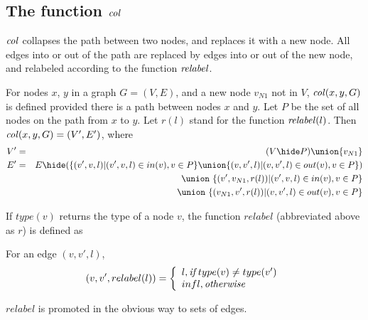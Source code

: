 \subsection{The function $\col$}




$\col$ collapses the path between two nodes, and replaces it with a new node. All edges into or out of the path are replaced by edges into or out of the new node, and  relabeled according to the function $\mathit{relabel}$.
  
\begin{definition}[$\col$]  \label{def:col}
  For nodes $x$, $y$ in a graph $G = (V,E)$, and a new node $v_{N1}$ not in $V$,  $\mathit{col}(x,y,G)$ is defined provided there is a path between nodes $x$ and $y$. Let $P$ be the set of all nodes on the path from $x$ to $y$. Let $r(l)$ stand for the function $\mathit{relabel}(l)$. Then $\mathit{col}(x,y,G) =  (V',E')$, where 
  \begin{eqnarray*}
  V' & = & (V\hide P) \union \{v_{N1}\}     \\
  E' & = & E\hide (
                   \{(v',v,l)|(v',v,l) \in in(v), v\in P\}
                   \union
                   \{(v,v',l)|(v,v',l) \in out(v), v\in P\}
                  )\\
  && \union\ \{(v',v_{N1},r(l))|(v',v,l) \in in(v), v\in P\}\\
  && \union\ \{(v_{N1},v',r(l))|(v,v',l) \in out(v), v\in P\}\\
  \end{eqnarray*}
\end{definition}
If $type(v)$ returns the type of a node $v$, the function $relabel$ (abbreviated above as $r$) is defined as 
\begin{definition}[$relabel$] \label{def:relabel}
  For an edge $(v,v',l)$, 
  \[
   (v,v',relabel(l)) = \left\{
   \begin{array}{l}
      l,    {\emph{if}}\; type(v) \neq type(v') \\
      infl, \emph{otherwise}
   \end{array}   \right.
  \]
\end{definition}
\noindent
$relabel$ is promoted in the obvious way to sets of edges.


